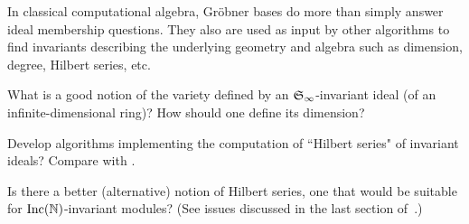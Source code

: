 
In classical computational algebra, Gr\"obner bases do more than simply answer ideal membership questions.  They also are used as input by other algorithms to find invariants describing the underlying geometry and algebra such as dimension, degree, Hilbert series, etc.  

\begin{question}
What is a good notion of the variety defined by an $\mathfrak S_\infty$-invariant ideal (of an infinite-dimensional ring)? How should one define its dimension? 
\end{question}

\begin{problem}
Develop algorithms implementing the computation of ``Hilbert series" of invariant ideals?  Compare with \cite{Nagel, krone2016hilbert}.
\end{problem}


\begin{question}
Is there a better (alternative) notion of Hilbert series, one that would be suitable for $\operatorname{Inc}(\mathbb N)$-invariant modules? 
(See issues discussed in the last section of~\cite{krone2016hilbert}.) 
\end{question}





